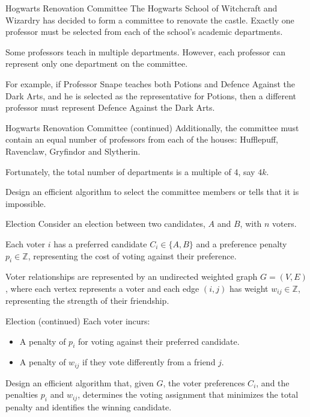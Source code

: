 \documentclass[aspectratio=169,11pt]{beamer}
\newcommand{\blankslides}{%
  \begin{frame}[plain]\end{frame}%
  \begin{frame}[plain]\end{frame}%
}
\begin{document}
\begin{frame}{Hogwarts Renovation Committee}
The Hogwarts School of Witchcraft and Wizardry has decided to form a committee to renovate the castle.
Exactly one professor must be selected from each of the school's academic departments.

\medskip
Some professors teach in multiple departments. However, each professor can represent only one department
on the committee.

\medskip
For example, if Professor Snape teaches both Potions and Defence Against the Dark Arts, and he is selected
as the representative for Potions, then a different professor must represent Defence Against the Dark Arts.
\end{frame}

\begin{frame}{Hogwarts Renovation Committee (continued)}
Additionally, the committee must contain an equal number of professors from each of the houses:
Hufflepuff, Ravenclaw, Gryfindor and Slytherin.

\medskip
Fortunately, the total number of departments is a multiple of 4, say $4k$.

\medskip
Design an efficient algorithm to select the committee members or tells that it is impossible.
\end{frame}
\blankslides

\begin{frame}{Election}
Consider an election between two candidates, $A$ and $B$, with $n$ voters.

\medskip
Each voter $i$ has a preferred candidate $C_i\in\{A,B\}$ and a preference penalty $p_i\in\mathbb{Z}$,
representing the cost of voting against their preference.

\medskip
Voter relationships are represented by an undirected weighted graph $G=(V,E)$, where each vertex represents
a voter and each edge $(i,j)$ has weight $w_{ij}\in\mathbb{Z}$, representing the strength of their friendship.
\end{frame}

\begin{frame}{Election (continued)}
Each voter incurs:
\begin{itemize}
  \item A penalty of $p_i$ for voting against their preferred candidate.
  \item A penalty of $w_{ij}$ if they vote differently from a friend $j$.
\end{itemize}
Design an efficient algorithm that, given $G$, the voter preferences $C_i$, and the penalties $p_i$ and
$w_{ij}$, determines the voting assignment that minimizes the total penalty and identifies the winning candidate.
\end{frame}
\blankslides
\end{document}
